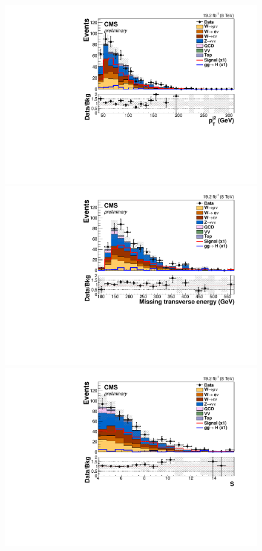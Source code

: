 \begin{figure}
    \includegraphics[width=.65\largefigwidth]{plots/parked/HIG-14-038-figs/output_sigreg/nunu_jet2_pt.pdf}
    \includegraphics[width=.65\largefigwidth]{plots/parked/HIG-14-038-figs/output_sigreg/nunu_metnomuons.pdf}
    \includegraphics[width=.65\largefigwidth]{plots/parked/HIG-14-038-figs/output_sigreg/nunu_metnomu_significance.pdf}

\end{figure}
